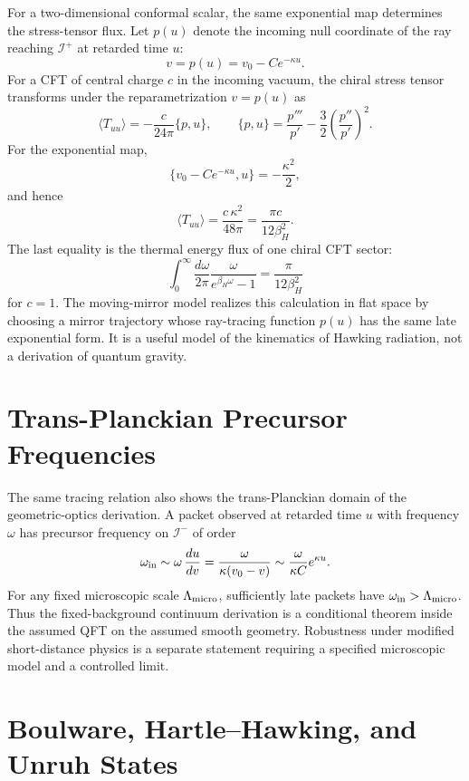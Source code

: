 For a two-dimensional conformal scalar, the same exponential map determines
the stress-tensor flux.  Let \(p(u)\) denote the incoming null coordinate of
the ray reaching \(\mathcal I^+\) at retarded time \(u\):
\[
  v=p(u)=v_0-Ce^{-\kappa u}.
\]
For a CFT of central charge \(c\) in the incoming vacuum, the chiral stress
tensor transforms under the reparametrization \(v=p(u)\) as
\begin{equation}
  \langle T_{uu}\rangle
  =
  -\frac{c}{24\pi}\{p,u\},
  \qquad
  \{p,u\}=\frac{p'''}{p'}-\frac32\left(\frac{p''}{p'}\right)^2 .
  \label{eq:hawking-schwarzian-flux}
\end{equation}
For the exponential map,
\[
  \{v_0-Ce^{-\kappa u},u\}=-\frac{\kappa^2}{2},
\]
and hence
\begin{equation}
  \langle T_{uu}\rangle
  =
  \frac{c\,\kappa^2}{48\pi}
  =
  \frac{\pi c}{12\beta_H^2}.
  \label{eq:hawking-two-dimensional-flux}
\end{equation}
The last equality is the thermal energy flux of one chiral CFT sector:
\[
  \int_0^\infty\frac{d\omega}{2\pi}
  \frac{\omega}{e^{\beta_H\omega}-1}
  =
  \frac{\pi}{12\beta_H^2}
\]
for \(c=1\).  The moving-mirror model realizes this calculation in flat
space by choosing a mirror trajectory whose ray-tracing function \(p(u)\)
has the same late exponential form.  It is a useful model of the kinematics
of Hawking radiation, not a derivation of quantum gravity.

\section{Trans-Planckian Precursor Frequencies}

The same tracing relation also shows the trans-Planckian domain of the
geometric-optics derivation.  A packet observed at retarded time \(u\) with
frequency \(\omega\) has precursor frequency on \(\mathcal I^-\) of order
\[
  \omega_{\rm in}
  \sim
  \omega\,\frac{du}{dv}
  =
  \frac{\omega}{\kappa(v_0-v)}
  \sim
  \frac{\omega}{\kappa C}e^{\kappa u}.
\]
For any fixed microscopic scale \(\Lambda_{\rm micro}\), sufficiently late
packets have \(\omega_{\rm in}>\Lambda_{\rm micro}\).  Thus the
fixed-background continuum derivation is a conditional theorem inside the
assumed QFT on the assumed smooth geometry.  Robustness under modified
short-distance physics is a separate statement requiring a specified
microscopic model and a controlled limit.

\section{Boulware, Hartle--Hawking, and Unruh States}


